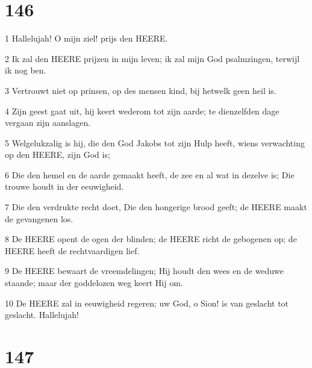 \chapter{146}

\par 1 Hallelujah! O mijn ziel! prijs den HEERE.
\par 2 Ik zal den HEERE prijzen in mijn leven; ik zal mijn God psalmzingen, terwijl ik nog ben.
\par 3 Vertrouwt niet op prinsen, op des mensen kind, bij hetwelk geen heil is.
\par 4 Zijn geest gaat uit, hij keert wederom tot zijn aarde; te dienzelfden dage vergaan zijn aanslagen.
\par 5 Welgelukzalig is hij, die den God Jakobs tot zijn Hulp heeft, wiens verwachting op den HEERE, zijn God is;
\par 6 Die den hemel en de aarde gemaakt heeft, de zee en al wat in dezelve is; Die trouwe houdt in der eeuwigheid.
\par 7 Die den verdrukte recht doet, Die den hongerige brood geeft; de HEERE maakt de gevangenen los.
\par 8 De HEERE opent de ogen der blinden; de HEERE richt de gebogenen op; de HEERE heeft de rechtvaardigen lief.
\par 9 De HEERE bewaart de vreemdelingen; Hij houdt den wees en de weduwe staande; maar der goddelozen weg keert Hij om.
\par 10 De HEERE zal in eeuwigheid regeren; uw God, o Sion! is van geslacht tot geslacht. Hallelujah!

\chapter{147}

